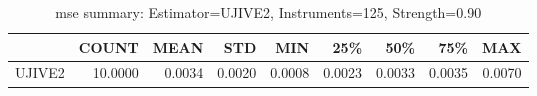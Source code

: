 \begin{table}[ht]
\centering
\caption{mse summary: Estimator=UJIVE2, Instruments=125, Strength=0.90}
\begin{tabular}{lrrrrrrrr}
\toprule
 & COUNT & MEAN & STD & MIN & 25\% & 50\% & 75\% & MAX \\
\midrule
UJIVE2 & 10.0000 & 0.0034 & 0.0020 & 0.0008 & 0.0023 & 0.0033 & 0.0035 & 0.0070 \\
\bottomrule
\end{tabular}
\end{table}
